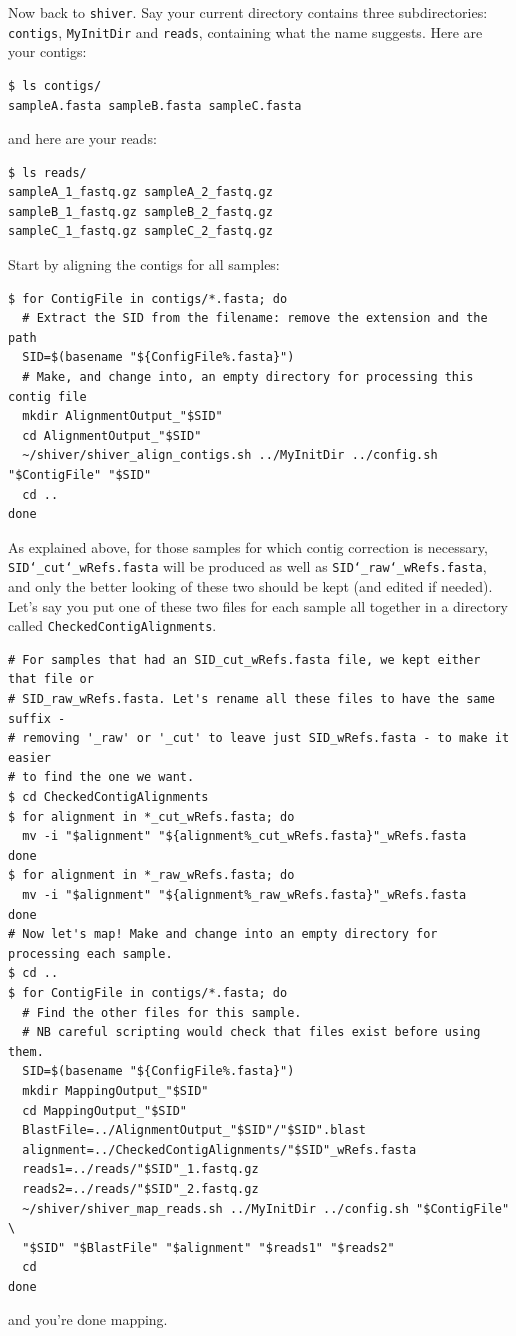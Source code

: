 \documentclass{article}
\newcommand{\shiv}{\texttt{shiver}\xspace}
\let\c\texttt
\begin{document}
Now back to \shiv.
Say your current directory contains three subdirectories: \c{contigs}, \c{MyInitDir} and \c{reads}, containing what the name suggests.
Here are your contigs:
\begin{Verbatim}[samepage=true]
$ ls contigs/
sampleA.fasta sampleB.fasta sampleC.fasta
\end{Verbatim}
and here are your reads:
\begin{Verbatim}[samepage=true]
$ ls reads/
sampleA_1_fastq.gz sampleA_2_fastq.gz  
sampleB_1_fastq.gz sampleB_2_fastq.gz  
sampleC_1_fastq.gz sampleC_2_fastq.gz
\end{Verbatim}
Start by aligning the contigs for all samples:
\begin{Verbatim}[samepage=true]
$ for ContigFile in contigs/*.fasta; do  
  # Extract the SID from the filename: remove the extension and the path
  SID=$(basename "${ConfigFile%.fasta}")
  # Make, and change into, an empty directory for processing this contig file
  mkdir AlignmentOutput_"$SID"  
  cd AlignmentOutput_"$SID"  
  ~/shiver/shiver_align_contigs.sh ../MyInitDir ../config.sh "$ContigFile" "$SID"
  cd ..
done
\end{Verbatim}
As explained above, for those samples for which contig correction is necessary, \c{SID\char`_cut\char`_wRefs.fasta} will be produced as well as \c{SID\char`_raw\char`_wRefs.fasta}, and only the better looking of these two should be kept (and edited if needed).
Let's say you put one of these two files for each sample all together in a directory called \c{CheckedContigAlignments}.  
\begin{Verbatim}[samepage=true]
# For samples that had an SID_cut_wRefs.fasta file, we kept either that file or
# SID_raw_wRefs.fasta. Let's rename all these files to have the same suffix -
# removing '_raw' or '_cut' to leave just SID_wRefs.fasta - to make it easier
# to find the one we want.  
$ cd CheckedContigAlignments  
$ for alignment in *_cut_wRefs.fasta; do
  mv -i "$alignment" "${alignment%_cut_wRefs.fasta}"_wRefs.fasta
done
$ for alignment in *_raw_wRefs.fasta; do
  mv -i "$alignment" "${alignment%_raw_wRefs.fasta}"_wRefs.fasta
done
# Now let's map! Make and change into an empty directory for processing each sample.
$ cd ..
$ for ContigFile in contigs/*.fasta; do  
  # Find the other files for this sample.
  # NB careful scripting would check that files exist before using them.
  SID=$(basename "${ConfigFile%.fasta}")
  mkdir MappingOutput_"$SID"
  cd MappingOutput_"$SID"
  BlastFile=../AlignmentOutput_"$SID"/"$SID".blast
  alignment=../CheckedContigAlignments/"$SID"_wRefs.fasta
  reads1=../reads/"$SID"_1.fastq.gz
  reads2=../reads/"$SID"_2.fastq.gz
  ~/shiver/shiver_map_reads.sh ../MyInitDir ../config.sh "$ContigFile" \
  "$SID" "$BlastFile" "$alignment" "$reads1" "$reads2"
  cd
done
\end{Verbatim}
and you're done mapping.
\end{document}
